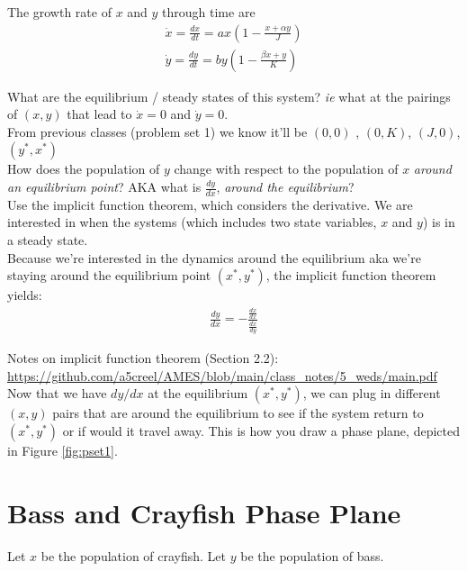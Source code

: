 \documentclass{article}
\begin{document}
The growth rate of $x$ and $y$ through time are
\begin{align*}
     \dot x = \frac{dx}{dt} = ax (1 - \frac{x + \alpha y}{J}) \\
     \dot y = \frac{dy}{dt} = by (1 - \frac{\beta x + y}{K})
\end{align*}


What are the equilibrium / steady states of this system? \textit{ie} what at the pairings of $(x,y)$ that lead to $\dot x = 0$ and $\dot y = 0$. \\

From previous classes (problem set 1) we know it'll be $(0,0)$ , $(0, K)$, $(J, 0)$, $(y^*, x^*)$\\

How does the population of $y$ change with respect to the population of $x$ \textit{around an equilibrium point}? AKA what is $\frac{dy}{dx}$, \textit{around the equilibrium}? \\

Use the implicit function theorem, which considers the derivative. We are interested in when the systems (which includes two state variables, $x$ and $y$) is in a steady state. \\

Because we're interested in the dynamics around the equilibrium aka  we're staying around the equilibrium point $(x^*, y^*)$, the implicit function theorem yields: 
\begin{align}
    \frac{dy}{dx} = - \frac{\frac{d \dot x}{dx}}{\frac{d \dot x}{ d y}}
\end{align}

Notes on implicit function theorem (Section 2.2): \url{https://github.com/a5creel/AMES/blob/main/class_notes/5_weds/main.pdf}\\



Now that we have $dy/dx$ at the equilibrium $(x^*, y^*)$, we can plug in different $(x,y)$ pairs that are around the equilibrium to see if the system return to $(x^*, y^*)$ or if would it travel away. This is how you draw a phase plane, depicted in Figure \ref{fig:pset1}. 


\section{Bass and Crayfish Phase Plane}

Let $x$ be the population of crayfish. Let $y$ be the population of bass. 
\end{document}
